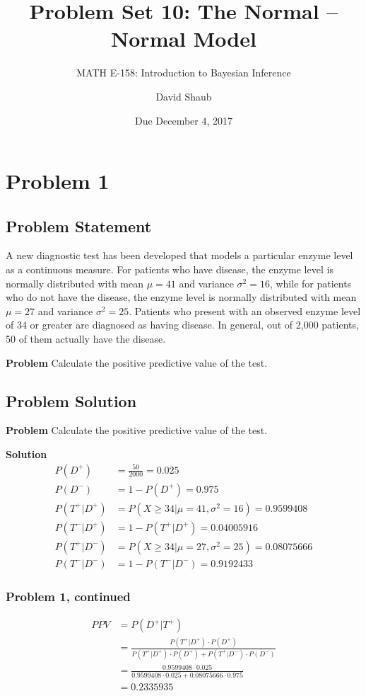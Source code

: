 \documentclass[12pt]{article}
\title{Problem Set 10: The Normal -- Normal Model}
\author{MATH E-158: Introduction to Bayesian Inference}
\author{David Shaub}
\date{Due December 4, 2017}
\theoremstyle{definition}
\begin{document}
	
	\maketitle


\section*{Problem 1}


\subsection*{Problem Statement}

A new diagnostic test has been developed that models a particular enzyme level as a continuous measure. For patients who have disease, the enzyme level is normally distributed with mean $\mu = 41$ and variance $\sigma^2 = 16$, while for patients who do not have the disease, the enzyme level is normally distributed with mean $\mu = 27$ and variance $\sigma^2 = 25$. Patients who present with an observed enzyme level of 34 or greater are diagnosed as having disease. In general, out of 2,000 patients, 50 of them actually have the disease.

\bigskip
\noindent
{\bf Problem} Calculate the positive predictive value of the test.



\subsection*{Problem Solution}

\noindent
{\bf Problem} Calculate the positive predictive value of the test.

\bigskip
\noindent
{\bf Solution} 
\begin{align*}
P(D^+) &= \frac{50}{2000} = 0.025\\
P(D^-) &= 1 - P(D^+) = 0.975\\
P(T^+|D^+) &= P(X \geq 34 | \mu = 41, \sigma^2 = 16) = 0.9599408\\
P(T^-|D^+) &= 1 - P(T^+|D^+) = 0.04005916\\
P(T^+|D^-) &= P(X \geq 34 | \mu = 27, \sigma^2 = 25) = 0.08075666\\
P(T^-|D^-) &= 1 - P(T^-|D^-) = 0.9192433
\end{align*}
\newpage
\subsubsection*{Problem 1, continued}
\begin{align*}
PPV &= P(D^+|T^+)\\
&= \frac{P(T^+|D^+)\cdot P(D^+)}{P(T^+|D^+)\cdot P(D^+) + P(T^+|D^-)\cdot P(D^-)}\\
&= \frac{0.9599408 \cdot 0.025}{0.9599408 \cdot 0.025 + 0.08075666 \cdot 0.975}\\
&= 0.2335935
\end{align*}
\end{document}
